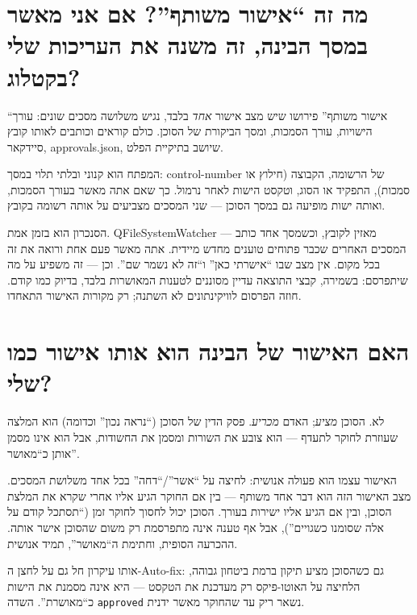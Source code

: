 \documentclass[12pt,a4paper]{article}
\begin{document}
\section{\texthebrew{מה זה ``אישור משותף''? אם אני מאשר במסך הבינה, זה משנה את העריכות שלי בקטלוג?}}
\begin{hebrew}
``אישור משותף'' פירושו שיש מצב אישור \emph{אחד} בלבד, נגיש משלושה מסכים שונים: עורך הישויות, עורך הסמכות, ומסך הביקורת של הסוכן. כולם קוראים וכותבים לאותו קובץ סיידקאר, \texthebrew{approvals.json}, שיושב בתיקיית הפלט.
\par
המפתח הוא קנוני ובלתי תלוי במסך: \texthebrew{control-number} של הרשומה, הקבוצה (חילוץ או סמכות), התפקיד או הסוג, וטקסט הישות לאחר נרמול. כך שאם אתה מאשר בעורך הסמכות, ואותה ישות מופיעה גם במסך הסוכן --- שני המסכים מצביעים על אותה רשומה בקובץ.
\par
הסנכרון הוא בזמן אמת. \texthebrew{QFileSystemWatcher} מאזין לקובץ, וכשמסך אחד כותב --- המסכים האחרים שכבר פתוחים טוענים מחדש מיידית. אתה מאשר פעם אחת ורואה את זה בכל מקום. אין מצב שבו ``אישרתי כאן'' ו``זה לא נשמר שם''. וכן --- זה משפיע על מה שיתפרסם: בשמירה, קבצי התוצאה עדיין מסוננים לטענות המאושרות בלבד, בדיוק כמו קודם. חוזה הפרסום לוויקינתונים לא השתנה; רק מקורות האישור התאחדו.
\end{hebrew}


\section{\texthebrew{האם האישור של הבינה הוא אותו אישור כמו שלי?}}
\begin{hebrew}
לא. הסוכן \emph{מציע}; האדם \emph{מכריע}. פסק הדין של הסוכן (``נראה נכון'' וכדומה) הוא המלצה שעוזרת לחוקר לתעדף --- הוא צובע את השורות ומסמן את החשודות, אבל הוא אינו מסמן אותן כ``מאושר''.
\par
האישור עצמו הוא פעולה אנושית: לחיצה על ``אשר''/``דחה'' בכל אחד משלושת המסכים. מצב האישור הזה הוא דבר אחד משותף --- בין אם החוקר הגיע אליו אחרי שקרא את המלצת הסוכן, ובין אם הגיע אליו ישירות בעורך. הסוכן יכול לחסוך לחוקר זמן (``תסתכל קודם על אלה שסומנו כשגויים''), אבל אף טענה אינה מתפרסמת רק משום שהסוכן אישר אותה. ההכרעה הסופית, וחתימת ה``מאושר'', תמיד אנושית.
\par
אותו עיקרון חל גם על לחצן ה-Auto-fix: גם כשהסוכן מציע תיקון ברמת ביטחון גבוהה, הלחיצה על האוטו-פיקס רק מעדכנת את הטקסט --- היא אינה מסמנת את הישות כ``מאושרת''. השדה \texttt{approved} נשאר ריק עד שהחוקר מאשר ידנית.
\end{hebrew}
\end{document}
